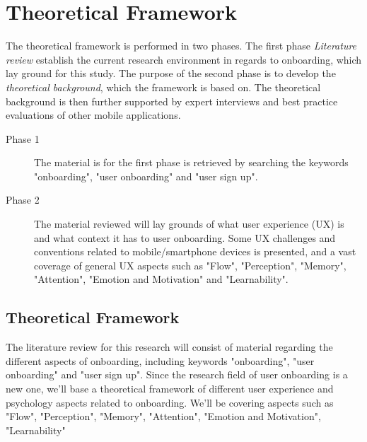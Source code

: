 \chapter{Theoretical Framework}
\label{chap:theoretical_framework}
The theoretical framework is performed in two phases. The first phase \textit{Literature review} establish the current research environment in regards to onboarding, which lay ground for this study. The purpose of the second phase is to develop the \textit{theoretical background}, which the framework is based on. The theoretical background is then further supported by expert interviews and best practice evaluations of other mobile applications.

\begin{description}
  \item [Phase 1] The material is for the first phase is retrieved by searching the keywords "onboarding", "user onboarding" and "user sign up".
  \item [Phase 2] The material reviewed will lay grounds of what user experience (UX) is and what context it has to user onboarding. Some UX challenges and conventions related to mobile/smartphone devices is presented, and a vast coverage of general UX aspects such as "Flow", "Perception", "Memory", "Attention", "Emotion and Motivation" and "Learnability".
\end{description}

\section{Theoretical Framework}


The literature review for this research will consist of material regarding the different aspects of onboarding, including keywords "onboarding", "user onboarding" and "user sign up". Since the research field of user onboarding is a new one, we'll base a theoretical framework of different user experience and psychology aspects related to onboarding. We'll be covering aspects such as "Flow", "Perception", "Memory", "Attention", "Emotion and Motivation", "Learnability"

